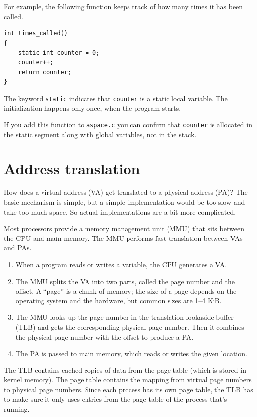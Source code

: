 \documentclass[12pt]{book}
\begin{document}
For example, the following function keeps track of how many times
it has been called.

\begin{verbatim}
int times_called()
{
    static int counter = 0;
    counter++;
    return counter;
}
\end{verbatim}

The keyword {\tt static} indicates that {\tt counter} is a static
local variable.  The initialization happens only once, when the program
starts.

If you add this function to {\tt aspace.c} you can confirm that
{\tt counter} is allocated in the static segment along with global
variables, not in the stack.


\section{Address translation}
\label{address_translation}

How does a virtual address (VA) get translated to a physical address
(PA)?  The basic mechanism is simple, but a simple
implementation would be too slow and take too much space.  So actual
implementations are a bit more complicated.

Most processors provide a memory management unit (MMU) that
sits between the CPU and main memory.  The MMU performs fast
translation between VAs and PAs.

\begin{enumerate}

\item When a program reads or writes a variable, the CPU generates a
VA.  

\item The MMU splits the VA into two parts, called the page number and
the offset.  A ``page'' is a chunk of memory; the size of a page
depends on the operating system and the hardware, but common sizes
are 1--4 KiB.

\item The MMU looks up the page number in the translation lookaside buffer (TLB) and gets the corresponding physical page number.  Then it combines
the physical page number with the offset to produce a PA.

\item The PA is passed to main memory, which reads or writes the given
location.

\end{enumerate}

The TLB contains cached copies of data from the page table (which is stored in kernel memory).  The page table contains the mapping from virtual page numbers to physical page numbers.  Since each process has its own page table, the TLB has to make sure it only uses entries from the page table of the process that's running.
\end{document}
